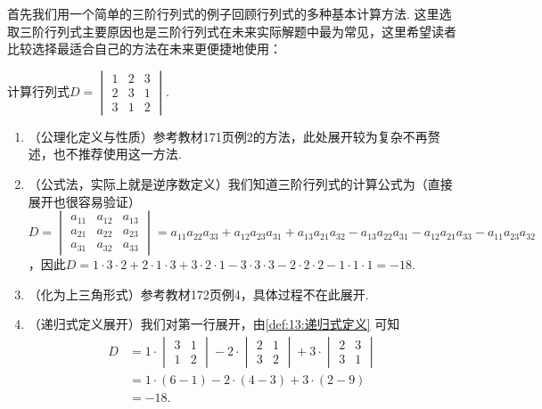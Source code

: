 首先我们用一个简单的三阶行列式的例子回顾行列式的多种基本计算方法. 这里选取三阶行列式主要原因也是三阶行列式在未来实际解题中最为常见，这里希望读者比较选择最适合自己的方法在未来更便捷地使用：
\begin{example}
    计算行列式$D=\begin{vmatrix}
            1 & 2 & 3 \\
            2 & 3 & 1 \\
            3 & 1 & 2
        \end{vmatrix}$.
\end{example}

\begin{solution}
    \begin{enumerate}
        \item （公理化定义与性质）参考教材171页例2的方法，此处展开较为复杂不再赘述，也不推荐使用这一方法.

        \item （公式法，实际上就是逆序数定义）我们知道三阶行列式的计算公式为（直接展开也很容易验证）$D=\begin{vmatrix}
                a_{11} & a_{12} & a_{13} \\
                a_{21} & a_{22} & a_{23} \\
                a_{31} & a_{32} & a_{33}
            \end{vmatrix}=a_{11}a_{22}a_{33}+a_{12}a_{23}a_{31}+a_{13}a_{21}a_{32}-a_{13}a_{22}a_{31}-a_{12}a_{21}a_{33}-a_{11}a_{23}a_{32}$，因此$D=1 \cdot 3 \cdot 2+2 \cdot 1 \cdot 3+3 \cdot 2 \cdot 1-3 \cdot 3 \cdot 3-2 \cdot 2 \cdot 2-1 \cdot 1 \cdot 1=-18$.

        \item （化为上三角形式）参考教材172页例4，具体过程不在此展开.

        \item （递归式定义展开）我们对第一行展开，由\autoref{def:13:递归式定义} 可知
              \begin{align*}
                  D &=1 \cdot \begin{vmatrix}
                      3 & 1 \\
                      1 & 2
                  \end{vmatrix}-2 \cdot \begin{vmatrix}
                      2 & 1 \\
                      3 & 2
                  \end{vmatrix}+3 \cdot \begin{vmatrix}
                      2 & 3 \\
                      3 & 1
                  \end{vmatrix} \\
                    &=1 \cdot (6-1)-2 \cdot (4-3)+3 \cdot (2-9) \\
                    &=-18.
              \end{align*}
    \end{enumerate}
\end{solution}

